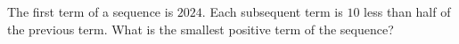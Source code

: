 The first term of a sequence is $2024$. Each subsequent term is $10$ less than half of the previous term. What is the smallest positive term of the sequence?
